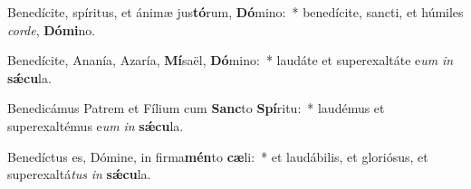 \item Benedícite, spíritus, et ánimæ jus\textbf{tó}rum, \textbf{Dó}mino:~* benedícite, sancti, et húmiles \textit{cor}\textit{de}, \textbf{Dó}\textbf{mi}no.
\item Benedícite, Ananía, Azaría, \textbf{Mí}saël, \textbf{Dó}mino:~* laudáte et superexaltáte e\textit{um} \textit{in} \textbf{sǽ}\textbf{cu}la.
\item Benedicámus Patrem et Fílium cum \textbf{Sanc}to \textbf{Spí}ritu:~* laudémus et superexaltémus e\textit{um} \textit{in} \textbf{sǽ}\textbf{cu}la.
\item Benedíctus es, Dómine, in firma\textbf{mén}to \textbf{cæ}li:~* et laudábilis, et gloriósus, et superexaltá\textit{tus} \textit{in} \textbf{sǽ}\textbf{cu}la.
